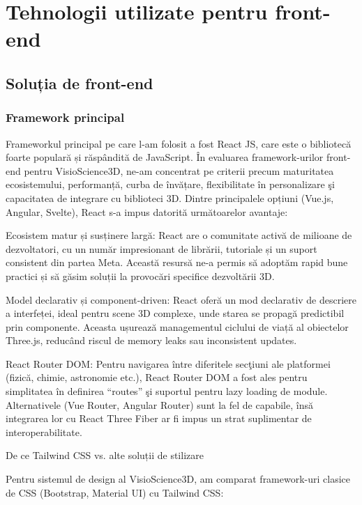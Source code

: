 \chapter{Tehnologii utilizate pentru front-end}
\label{chapter:tehnologii}

\label{sec:proj}
\section{Soluția de front-end}
\subsection{Framework principal}

Frameworkul principal pe care l-am folosit a fost React JS, care este o bibliotecă foarte populară
și răspândită de JavaScript. În evaluarea framework-urilor front-end pentru VisioScience3D,
 ne-am concentrat pe criterii precum maturitatea ecosistemului, performanță, curba de învățare,
  flexibilitate în personalizare şi capacitatea de integrare cu biblioteci 3D. Dintre principalele
   opțiuni (Vue.js, Angular, Svelte), React s-a impus datorită următoarelor avantaje:

Ecosistem matur și susținere largă: React are o comunitate activă de milioane de dezvoltatori,
 cu un număr impresionant de librării, tutoriale și un suport consistent din partea Meta. 
 Această resursă ne-a permis să adoptăm rapid bune practici și să găsim soluții la provocări 
 specifice dezvoltării 3D.

Model declarativ și component-driven: React oferă un mod declarativ de descriere a interfeței,
 ideal pentru scene 3D complexe, unde starea se propagă predictibil prin componente. Aceasta 
 ușurează managementul ciclului de viață al obiectelor Three.js, reducând riscul de memory 
 leaks sau inconsistent updates.

React Router DOM: Pentru navigarea între diferitele secţiuni ale platformei (fizică, chimie,
 astronomie etc.), React Router DOM a fost ales pentru simplitatea în definirea “routes” şi 
 suportul pentru lazy loading de module. Alternativele (Vue Router, Angular Router) sunt la 
 fel de capabile, însă integrarea lor cu React Three Fiber ar fi impus un strat suplimentar
  de interoperabilitate.

De ce Tailwind CSS vs. alte soluții de stilizare

Pentru sistemul de design al VisioScience3D, am comparat framework-uri clasice de CSS
 (Bootstrap, Material UI) cu Tailwind CSS:

